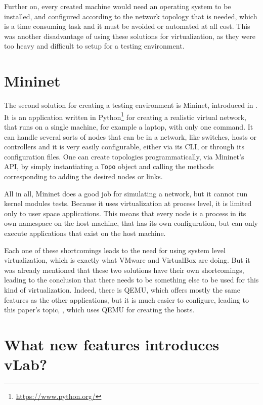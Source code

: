 Further on, every created machine would need an operating system to be installed, and configured according to the network topology that is needed, which is a time consuming task and it must be avoided or automated at all cost.
This was another disadvantage of using these solutions for virtualization, as they were too heavy and difficult to setup for a testing environment.

\section{Mininet}
\label{sec:mininet}

The second solution for creating a testing environment is Mininet, introduced in .
It is an application written in Python\footnote{\url{https://www.python.org/}} for creating a realistic virtual network, that runs on a single machine, for example a laptop, with only one command.
It can handle several sorts of nodes that can be in a network, like switches, hosts or controllers and it is very easily configurable, either via its CLI, or through its configuration files.
One can create topologies programmatically, via Mininet's API, by simply instantiating a \texttt{Topo} object and calling the methods corresponding to adding the desired nodes or links.

All in all, Mininet does a good job for simulating a network, but it cannot run kernel modules tests.
Because it uses virtualization at process level, it is limited only to user space applications.
This means that every node is a process in its own namespace on the host machine, that has its own configuration, but can only execute applications that exist on the host machine.

Each one of these shortcomings leads to the need for using system level virtualization, which is exactly what VMware and VirtualBox are doing.
But it was already mentioned that these two solutions have their own shortcomings, leading to the conclusion that there needs to be something else to be used for this kind of virtualization.
Indeed, there is QEMU, which offers mostly the same features as the other applications, but it is much easier to configure, leading to this paper's topic, \project, which uses QEMU for creating the hosts.


\section{What new features introduces vLab?}
\label{sec:vlab-new-features}

